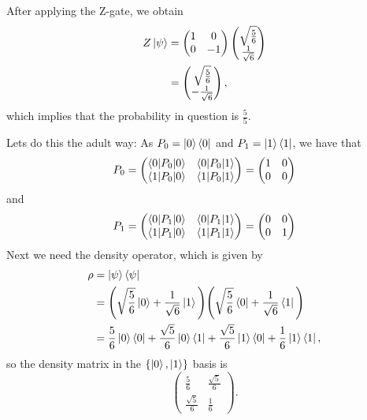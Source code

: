 \documentclass[10pt]{article}
\begin{document}
After applying the Z-gate, we obtain
\begin{align*}
Z\ket{\psi} &= 
\begin{pmatrix}
1 & 0 \\
0 & -1
\end{pmatrix}
\begin{pmatrix}
\sqrt{\frac{5}{6}} \\
\frac{1}{\sqrt{6}}
\end{pmatrix} \\
&= 
\begin{pmatrix}
\sqrt{\frac{5}{6}} \\
-\frac{1}{\sqrt{6}}
\end{pmatrix},
\end{align*}
which implies that the probability in question is $\frac{5}{5}$.

Lets do this the adult way:
As $P_0 = \ket{0}\bra{0}$ and $P_1 = \ket{1} \bra{1}$, we have that
\[
P_0 = \begin{pmatrix}
\braket{0|P_0|0} & \braket{0|P_0|1} \\
\braket{1|P_0|0} & \braket{1|P_0|1} 
\end{pmatrix}
= \begin{pmatrix}
1 & 0 \\
0 & 0
\end{pmatrix}
\]
and
\[
P_1 = \begin{pmatrix}
\braket{0|P_1|0} & \braket{0|P_1|1} \\
\braket{1|P_1|0} & \braket{1|P_1|1} 
\end{pmatrix}
= \begin{pmatrix}
0 & 0 \\
0 & 1
\end{pmatrix}
\]
Next we need the density operator, which is given by
\begin{align*}
\rho &= \ket{\psi} \bra{\psi} \\
        &= \Bigg( \sqrt{\frac{5}{6}} \ket{0} + \frac{1}{\sqrt{6}} \ket{1} \Bigg) \Bigg( \sqrt{\frac{5}{6}} \bra{0} + \frac{1}{\sqrt{6}} \bra{1} \Bigg) \\
        &= \frac{5}{6} \ket{0} \bra{0} + \frac{\sqrt{5}}{6} \ket{0} \bra{1} + \frac{\sqrt{5}}{6} \ket{1} \bra{0} + \frac{1}{6} \ket{1} \bra{1},
\end{align*}
so the density matrix in the $\{ \ket{0}, \ket{1} \}$ basis is
\[
\begin{pmatrix}
\frac{5}{6} & \frac{\sqrt{5}}{6} \\
\frac{\sqrt{5}}{6} & \frac{1}{6}
\end{pmatrix}.
\]
\end{document}
